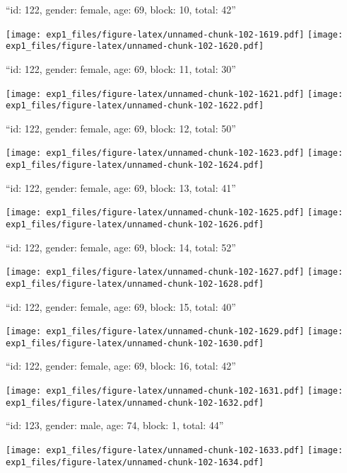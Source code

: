 \documentclass[11pt,,]{article}
\begin{document}
\newpage
[1] 

``id: 122, gender: female, age: 69, block: 10, total: 42''

\texttt{[image: exp1\_files/figure-latex/unnamed-chunk-102-1619.pdf]}
\texttt{[image: exp1\_files/figure-latex/unnamed-chunk-102-1620.pdf]}

\newpage
[1] 

``id: 122, gender: female, age: 69, block: 11, total: 30''

\texttt{[image: exp1\_files/figure-latex/unnamed-chunk-102-1621.pdf]}
\texttt{[image: exp1\_files/figure-latex/unnamed-chunk-102-1622.pdf]}

\newpage
[1] 

``id: 122, gender: female, age: 69, block: 12, total: 50''

\texttt{[image: exp1\_files/figure-latex/unnamed-chunk-102-1623.pdf]}
\texttt{[image: exp1\_files/figure-latex/unnamed-chunk-102-1624.pdf]}

\newpage
[1] 

``id: 122, gender: female, age: 69, block: 13, total: 41''

\texttt{[image: exp1\_files/figure-latex/unnamed-chunk-102-1625.pdf]}
\texttt{[image: exp1\_files/figure-latex/unnamed-chunk-102-1626.pdf]}

\newpage
[1] 

``id: 122, gender: female, age: 69, block: 14, total: 52''

\texttt{[image: exp1\_files/figure-latex/unnamed-chunk-102-1627.pdf]}
\texttt{[image: exp1\_files/figure-latex/unnamed-chunk-102-1628.pdf]}

\newpage
[1] 

``id: 122, gender: female, age: 69, block: 15, total: 40''

\texttt{[image: exp1\_files/figure-latex/unnamed-chunk-102-1629.pdf]}
\texttt{[image: exp1\_files/figure-latex/unnamed-chunk-102-1630.pdf]}

\newpage
[1] 

``id: 122, gender: female, age: 69, block: 16, total: 42''

\texttt{[image: exp1\_files/figure-latex/unnamed-chunk-102-1631.pdf]}
\texttt{[image: exp1\_files/figure-latex/unnamed-chunk-102-1632.pdf]}

\newpage
[1] 

``id: 123, gender: male, age: 74, block: 1, total: 44''

\texttt{[image: exp1\_files/figure-latex/unnamed-chunk-102-1633.pdf]}
\texttt{[image: exp1\_files/figure-latex/unnamed-chunk-102-1634.pdf]}
\end{document}
